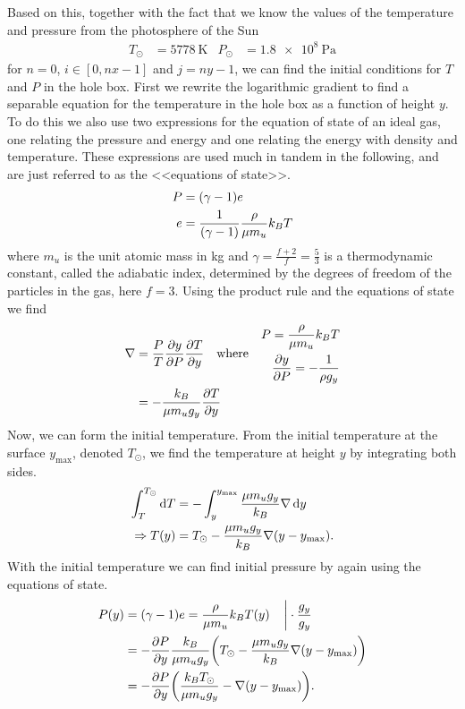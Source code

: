 \documentclass[11pt,a4paper,twocolumn,titlepage]{article}
\begin{document}
Based on this, together with the fact that we know the values of the temperature and pressure from the photosphere of the Sun
\begin{align*}
&& T_\odot &= \SI{5778}{\kelvin} & P_\odot &= \SI{1.8e8}{\Pa} &&
\end{align*}
for $n = 0$, $i \in[0,nx-1]$ and $j = ny-1$, we can find the initial conditions for $T$ and $P$ in the hole box. First we rewrite the logarithmic gradient to find a separable equation for the temperature in the hole box as a function of height $y$. To do this we also use two expressions for the equation of state of an ideal gas, one relating the pressure and energy and one relating the energy with density and temperature. These expressions are used much in tandem in the following, and are just referred to as the <<equations of state>>.
\begin{align*}
P &= \qty(\gamma -1 )e
\\
e &= \frac{1}{(\gamma-1)}\frac{\rho}{\mu m_u} k_B T
\end{align*}
where $m_u$ is the unit atomic mass in \si{\kilogram} and ${\gamma = \tfrac{f+2}{f} = \tfrac{5}{3}}$ is a thermodynamic constant, called the adiabatic index, determined by the degrees of freedom of the particles in the gas, here $f=3$. Using the product rule and the equations of state we find
\begin{align*}
\nabla &= \frac{P}{T}\pdv{y}{P}\pdv{T}{y} \qq{where}
\begin{aligned}
P = \frac{\rho}{\mu m_u}k_B T
\\
\pdv{y}{P} = -\frac{1}{\rho g_y}
\end{aligned}
\\
&= -\frac{k_B}{\mu m_u g_y}\pdv{T}{y}
\end{align*}
Now, we can form the initial temperature. From the initial temperature at the surface $y_\text{max}$, denoted $T_\odot$, we find the temperature at height $y$ by integrating both sides.
\begin{align}
\int_T^{T_\odot}\dd{T}&= - \int^{y_\text{max}}_y \frac{\mu m_u g_y}{k_B}\nabla \dd{y} \notag
\\
\Rightarrow T(y) &= T_\odot - \frac{\mu m_u g_y}{k_B}\nabla\qty(y-y_\text{max}). \label{eq:Initial T}
\end{align}
With the initial temperature we can find initial pressure by again using the equations of state.
\begin{align}
P(y) &= (\gamma-1)e = \frac{\rho}{\mu m_u}k_B T(y) \quad \eval \cdot \frac{g_y}{g_y}\notag
\\
&= -\pdv{P}{y} \frac{k_B}{\mu m_u g_y} \qty(T_\odot - \frac{\mu m_u g_y}{k_B}\nabla\qty(y-y_\text{max})) \notag
\\
&= -\pdv{P}{y} \qty(\frac{k_BT_\odot}{\mu m_u g_y}-\nabla(y-y_\text{max})). \label{eq:Init P before beta}
\end{align}
\end{document}
